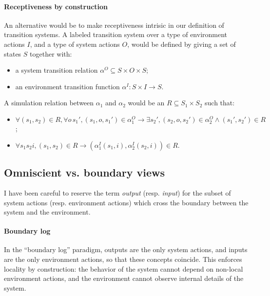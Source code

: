 \documentclass[11pt]{article}
\begin{document}
\paragraph{Receptiveness by construction}

An alternative would be to make receptiveness intrisic
in our definition of transition systems.
A labeled transition system over
a type of environment actions $I$, and
a type of system actions $O$,
would be defined by giving a set of states $S$ together with:
\begin{itemize}
\item a system transition relation $\alpha^O \subseteq S \times O \times S$;
\item an environment transition function $\alpha^I : S \times I \rightarrow S$.
\end{itemize}
A simulation relation between $\alpha_1$ and $\alpha_2$
would be an $R \subseteq S_1 \times S_2$ such that:
\begin{itemize}
\item $\forall (s_1, s_2) \in R,
  \forall o \, s_1', (s_1, o, s_1') \in \alpha_1^O \rightarrow
  \exists s_2', (s_2, o, s_2') \in \alpha_2^O \wedge (s_1', s_2') \in R$;
\item $\forall s_1 s_2 i, (s_1, s_2) \in R \rightarrow
  (\alpha^I_1(s_1, i), \alpha^I_2(s_2, i)) \in R$.
\end{itemize}



\subsection{Omniscient vs. boundary views} %

I have been careful to reserve the term \emph{output} (resp. \emph{input})
for the subset of system actions (resp. environment actions)
which cross the boundary between the system and the environment.

\paragraph{Boundary log}

In the ``boundary log'' paradigm,
outputs are the only system actions, and
inputs are the only environment actions,
so that these concepts coincide.
This enforces locality by construction:
the behavior of the system
cannot depend on non-local environment actions,
and the environment
cannot observe internal details of the system.
\end{document}
